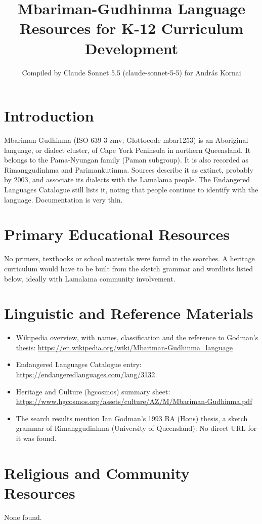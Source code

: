 \documentclass[12pt]{article}
\title{Mbariman-Gudhinma Language Resources for K-12 Curriculum Development}
\author{Compiled by Claude Sonnet 5.5 (claude-sonnet-5-5) for Andr\'as Kornai}
\date{}
\begin{document}
\maketitle

\section{Introduction}
Mbariman-Gudhinma (ISO 639-3 zmv; Glottocode mbar1253) is an Aboriginal language, or dialect cluster, of Cape York Peninsula in northern Queensland. It belongs to the Pama-Nyungan family (Paman subgroup). It is also recorded as Rimanggudinhma and Parimankutinma. Sources describe it as extinct, probably by 2003, and associate its dialects with the Lamalama people. The Endangered Languages Catalogue still lists it, noting that people continue to identify with the language. Documentation is very thin.

\section{Primary Educational Resources}
No primers, textbooks or school materials were found in the searches. A heritage curriculum would have to be built from the sketch grammar and wordlists listed below, ideally with Lamalama community involvement.

\section{Linguistic and Reference Materials}
\begin{itemize}
\item Wikipedia overview, with names, classification and the reference to Godman's thesis: \url{https://en.wikipedia.org/wiki/Mbariman-Gudhinma_language}
\item Endangered Languages Catalogue entry: \url{https://endangeredlanguages.com/lang/3132}
\item Heritage and Culture (hgcosmos) summary sheet: \url{https://www.hgcosmos.org/assets/culture/AZ/M/Mbariman-Gudhinma.pdf}
\item The search results mention Ian Godman's 1993 BA (Hons) thesis, a sketch grammar of Rimanggudinhma (University of Queensland). No direct URL for it was found.
\end{itemize}

\section{Religious and Community Resources}
None found.
\end{document}
